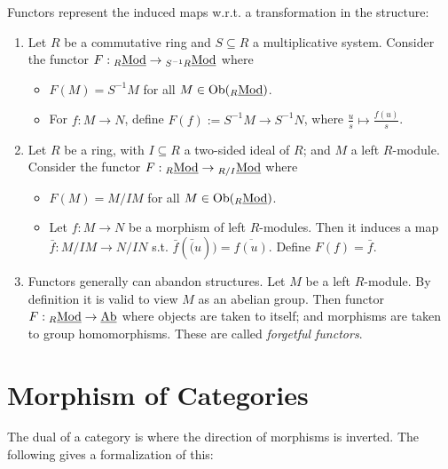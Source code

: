\begin{example}
    Functors represent the induced maps w.r.t. a transformation in the structure:
    \begin{enumerate}
        \item Let $R$ be a commutative ring and $S \subseteq R$ a multiplicative system. Consider the functor $F: {}_{R}\underline{\textup{Mod}} \to {}_{S^{-1}R}\underline{\textup{Mod}}$ where
        \begin{itemize}
            \item $F(M) = S^{-1}M$ for all $M \in \mathrm{Ob}({}_{R}\underline{\textup{Mod}})$.
            \item For $f: M \to N$, define $F(f) := S^{-1}M \to S^{-1}N$, where $\frac{u}{s} \mapsto \frac{f(u)}{s}$.
        \end{itemize}
        \item Let $R$ be a ring, with $I \subseteq R$ a two-sided ideal of $R$; and $M$ a left $R$-module. Consider the functor $F: {}_{R}\underline{\textup{Mod}} \to {}_{R/I}\underline{\textup{Mod}}$ where
        \begin{itemize}
            \item $F(M) = M/IM$ for all $M \in \mathrm{Ob}({}_{R}\underline{\textup{Mod}})$. 
            \item Let $f: M \to N$ be a morphism of left $R$-modules. Then it induces a map $\bar{f}: M/IM \to N/IN$ s.t. $\bar{f}(\bar(u)) = \overline{f(u)}$. Define $F(f) = \bar{f}$.
        \end{itemize}
        \item Functors generally can abandon structures. Let $M$ be a left $R$-module. By definition it is valid to view $M$ as an abelian group. Then functor $F: {}_{R}\underline{\textup{Mod}} \to \underline{\textup{Ab}}$ where objects are taken to itself; and morphisms are taken to group homomorphisms. These are called \emph{forgetful functors}.
    \end{enumerate}
\end{example}

\section{Morphism of Categories}

The dual of a category is where the direction of morphisms is inverted. The following gives a formalization of this:

